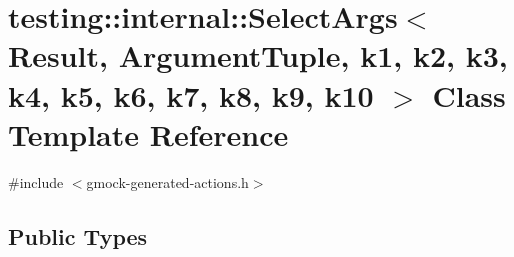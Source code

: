 \hypertarget{classtesting_1_1internal_1_1_select_args}{}\section{testing\+:\+:internal\+:\+:Select\+Args$<$ Result, Argument\+Tuple, k1, k2, k3, k4, k5, k6, k7, k8, k9, k10 $>$ Class Template Reference}
\label{classtesting_1_1internal_1_1_select_args}


{\ttfamily \#include $<$gmock-\/generated-\/actions.\+h$>$}

\subsection*{Public Types}
